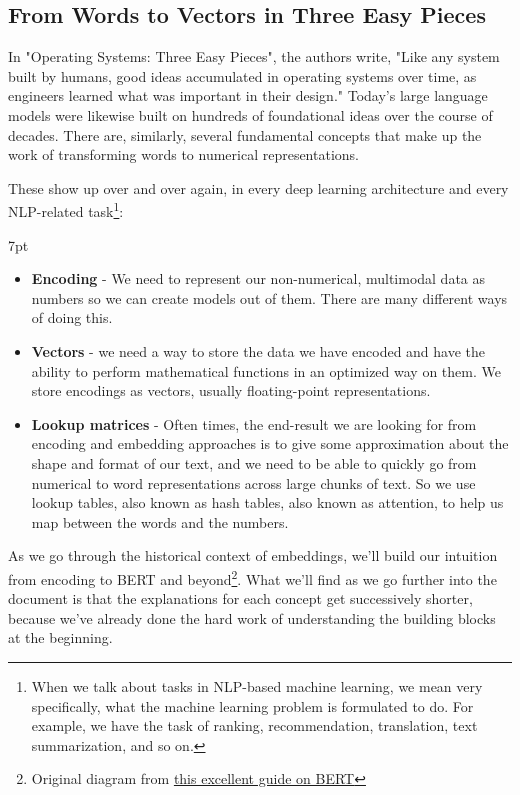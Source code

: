 \documentclass[11pt, table]{diazessay} %
\newenvironment{formal}{%
  \def\FrameCommand{%
	\hspace{1pt}%
	{\color{w_lightblue}\vrule width 2pt}%
	{\color{formalshade}\vrule width 4pt}%
	\colorbox{formalshade}%
  }%
  \MakeFramed{\advance\hsize-\width\FrameRestore}%
  \noindent\hspace{-4.55pt}%
  \begin{adjustwidth}{}{7pt}%
  \vspace{2pt}\vspace{2pt}%
}
{%
  \vspace{2pt}\end{adjustwidth}\endMakeFramed%
}
\begin{document}
\begin{sloppypar}
\subsection{From Words to Vectors in Three Easy Pieces}
In "Operating Systems: Three Easy Pieces", the authors write, "Like any system built by humans, good ideas accumulated in operating systems over time, as engineers learned what was important in their design." \citep{arpaci2018operating} Today's large language models were likewise built on hundreds of foundational ideas over the course of decades.  There are, similarly, several fundamental concepts that make up the work of transforming words to numerical representations.

These show up over and over again, in every deep learning architecture and every NLP-related task\footnote{When we talk about tasks in NLP-based machine learning, we mean very specifically, what the machine learning problem is formulated to do. For example, we have the task of ranking, recommendation, translation, text summarization, and so on.}:

\begin{formal}
\begin{itemize}
  \item \textbf{Encoding} - We need to represent our non-numerical, multimodal data as numbers so we can create models out of them. There are many different ways of doing this.
  \item \textbf{Vectors} - we need a way to store the data we have encoded and have the ability to perform mathematical functions in an optimized way on them. We store encodings as vectors, usually floating-point representations.
  \item \textbf{Lookup matrices} - Often times, the end-result we are looking for from encoding and embedding approaches is to give some approximation about the shape and format of our text, and we need to be able to quickly go from numerical to word representations across large chunks of text. So we use lookup tables, also known as hash tables, also known as attention, to help us map between the words and the numbers.
\end{itemize}
\end{formal}

As we go through the historical context of embeddings, we'll build our intuition from encoding to BERT and beyond\footnote{Original diagram from  \href{http://mccormickml.com/2019/11/11/bert-research-ep-1-key-concepts-and-sources/}{this excellent guide on BERT}}. What we'll find as we go further into the document is that the explanations for each concept get successively shorter, because we've already done the hard work of understanding the building blocks at the beginning.


\end{sloppypar}
\end{document}
